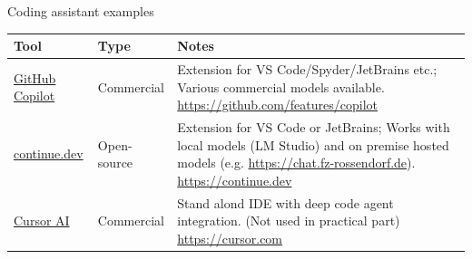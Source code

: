 \documentclass[
  aspectratio=1610,
]{beamer}
\begin{document}





\begin{frame}{Coding assistant examples}
  \begin{tabularx}{\linewidth}{@{} l l X @{}}
    \toprule
    \textbf{Tool}                                              & \textbf{Type} & \textbf{Notes}                                                                                                                                                                                                                     \\
    \midrule
    \href{https://github.com/features/copilot}{GitHub Copilot} & Commercial    & Extension for VS Code/Spyder/JetBrains etc.; Various commercial models available. \href{https://github.com/features/copilot}{https://github.com/features/copilot}                                                                  \\
    \href{https://continue.dev}{continue.dev}                  & Open-source   & Extension for VS Code or JetBrains; Works with local models (LM Studio) and on premise hosted models (e.g. \href{https://chat.fz-rossendorf.de}{https://chat.fz-rossendorf.de}). \href{https://continue.dev}{https://continue.dev} \\
    \href{https://cursor.com}{Cursor AI}                       & Commercial    & Stand alond IDE with deep code agent integration. (Not used in practical part) \href{https://cursor.com}{https://cursor.com}                                                                                                       \\
    \bottomrule
  \end{tabularx}
\end{frame}
\end{document}
